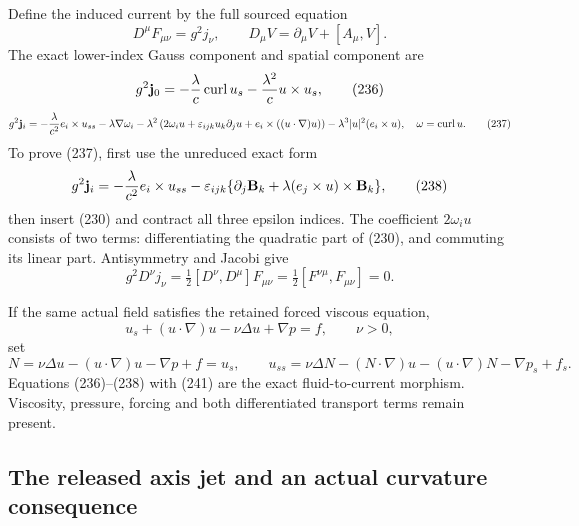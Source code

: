\documentclass[11pt]{article}
\begin{document}
Define the induced current by the full sourced equation
\[
 D^\mu F_{\mu\nu}=g^2j_\nu,\qquad D_\mu V=\partial_\mu V+[A_\mu,V].
\tag{235}
\]
The exact lower-index Gauss component and spatial component are
\[
 g^2{\bf j}_0=-\frac{\lambda}{c}\operatorname{curl}u_s
              -\frac{\lambda^2}{c}u\times u_s,
\tag{236}
\]
\[
 g^2{\bf j}_i=-\frac{\lambda}{c^2}e_i\times u_{ss}
 -\lambda\nabla\omega_i
 -\lambda^2\left(2\omega_i u+
 \varepsilon_{ijk}u_k\partial_j u+e_i\times((u\cdot\nabla)u)\right)
 -\lambda^3|u|^2(e_i\times u),\quad \omega=\operatorname{curl}u.
\tag{237}
\]
To prove (237), first use the unreduced exact form
\[
 g^2{\bf j}_i=-\frac{\lambda}{c^2}e_i\times u_{ss}
 -\varepsilon_{ijk}\{\partial_j{\bf B}_k+
 \lambda(e_j\times u)\times{\bf B}_k\},
\tag{238}
\]
then insert (230) and contract all three epsilon indices. The coefficient
\(2\omega_i u\) consists of two terms: differentiating the quadratic
part of (230), and commuting its linear part. Antisymmetry and Jacobi give
\[
 g^2D^\nu j_\nu
 =\tfrac12[D^\nu,D^\mu]F_{\mu\nu}
 =\tfrac12[F^{\nu\mu},F_{\mu\nu}]=0.
\tag{239}
\]

If the same actual field satisfies the retained forced viscous equation,
\[
 u_s+(u\cdot\nabla)u-\nu\Delta u+\nabla p=f,\qquad \nu>0,
\tag{240}
\]
set
\[
 N=\nu\Delta u-(u\cdot\nabla)u-\nabla p+f=u_s,\qquad
 u_{ss}=\nu\Delta N-(N\cdot\nabla)u-(u\cdot\nabla)N-\nabla p_s+f_s.
\tag{241}
\]
Equations (236)--(238) with (241) are the exact fluid-to-current
morphism. Viscosity, pressure, forcing and both differentiated transport
terms remain present.

\subsection{The released axis jet and an actual curvature consequence}
\end{document}
